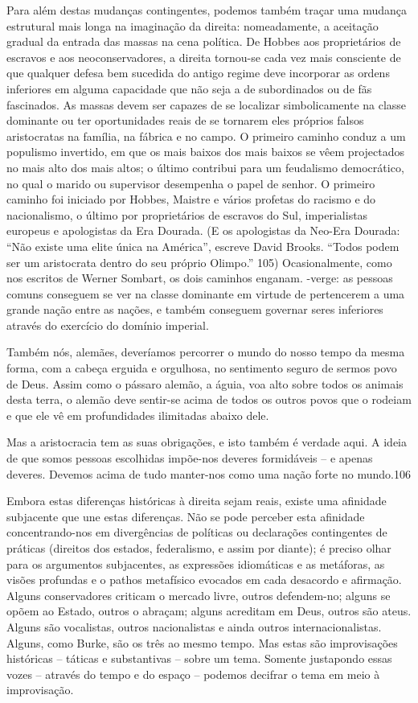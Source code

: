  \par 
Para além destas mudanças contingentes, podemos também traçar uma mudança estrutural mais longa na imaginação da direita: nomeadamente, a aceitação gradual da entrada das massas na cena política. De Hobbes aos proprietários de escravos e aos neoconservadores, a direita tornou-se cada vez mais consciente de que qualquer defesa bem sucedida do antigo regime deve incorporar as ordens inferiores em alguma capacidade que não seja a de subordinados ou de fãs fascinados. As massas devem ser capazes de se localizar simbolicamente na classe dominante ou ter oportunidades reais de se tornarem eles próprios falsos aristocratas na família, na fábrica e no campo. O primeiro caminho conduz a um populismo invertido, em que os mais baixos dos mais baixos se vêem projectados no mais alto dos mais altos; o último contribui para um feudalismo democrático, no qual o marido ou supervisor desempenha o papel de senhor. O primeiro caminho foi iniciado por Hobbes, Maistre e vários profetas do racismo e do nacionalismo, o último por proprietários de escravos do Sul, imperialistas europeus e apologistas da Era Dourada. (E os apologistas da Neo-Era Dourada: “Não existe uma elite única na América”, escreve David Brooks. “Todos podem ser um aristocrata dentro do seu próprio Olimpo.” {\color{blue}105}) Ocasionalmente, como nos escritos de Werner Sombart, os dois caminhos enganam. -verge: as pessoas comuns conseguem se ver na classe dominante em virtude de pertencerem a uma grande nação entre as nações, e também conseguem governar seres inferiores através do exercício do domínio imperial.
 \par 
Também nós, alemães, deveríamos percorrer o mundo do nosso tempo da mesma forma, com a cabeça erguida e orgulhosa, no sentimento seguro de sermos povo de Deus. Assim como o pássaro alemão, a águia, voa alto sobre todos os animais desta terra, o alemão deve sentir-se acima de todos os outros povos que o rodeiam e que ele vê em profundidades ilimitadas abaixo dele.
 \par 
Mas a aristocracia tem as suas obrigações, e isto também é verdade aqui. A ideia de que somos pessoas escolhidas impõe-nos deveres formidáveis ​​– e apenas deveres. Devemos acima de tudo manter-nos como uma nação forte no mundo.{\color{blue}106}
 \par 
Embora estas diferenças históricas à direita sejam reais, existe uma afinidade subjacente que une estas diferenças. Não se pode perceber esta afinidade concentrando-nos em divergências de políticas ou declarações contingentes de práticas (direitos dos estados, federalismo, e assim por diante); é preciso olhar para os argumentos subjacentes, as expressões idiomáticas e as metáforas, as visões profundas e o pathos metafísico evocados em cada desacordo e afirmação. Alguns conservadores criticam o mercado livre, outros defendem-no; alguns se opõem ao Estado, outros o abraçam; alguns acreditam em Deus, outros são ateus. Alguns são vocalistas, outros nacionalistas e ainda outros internacionalistas. Alguns, como Burke, são os três ao mesmo tempo. Mas estas são improvisações históricas – táticas e substantivas – sobre um tema. Somente justapondo essas vozes – através do tempo e do espaço – podemos decifrar o tema em meio à improvisação.
